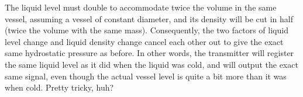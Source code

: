 The liquid level must double to accommodate twice the volume in the same vessel, assuming a vessel of constant diameter, and its density will be cut in half (twice the volume with the same mass).  Consequently, the two factors of liquid level change and liquid density change cancel each other out to give the exact same hydrostatic pressure as before.  In other words, the transmitter will register the same liquid level as it did when the liquid was cold, and will output the exact same signal, even though the actual vessel level is quite a bit more than it was when cold.  Pretty tricky, huh?











